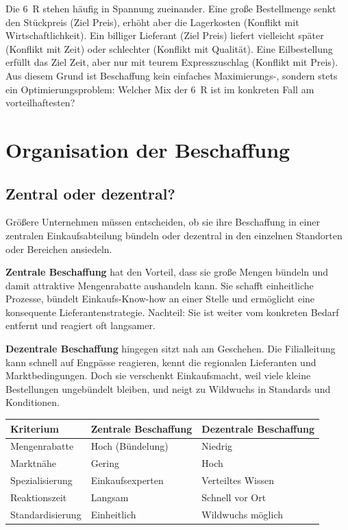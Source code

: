 \documentclass[11pt, a4paper]{article}
\begin{document}
Die 6~R stehen häufig in Spannung zueinander. Eine große Bestellmenge senkt den
Stückpreis (Ziel Preis), erhöht aber die Lagerkosten (Konflikt mit Wirtschaftlichkeit).
Ein billiger Lieferant (Ziel Preis) liefert vielleicht später (Konflikt mit Zeit) oder
schlechter (Konflikt mit Qualität). Eine Eilbestellung erfüllt das Ziel Zeit, aber nur
mit teurem Express­zuschlag (Konflikt mit Preis). Aus diesem Grund ist Beschaffung kein
einfaches Maximierungs-, sondern stets ein Optimierungs­problem: Welcher Mix der 6~R
ist im konkreten Fall am vorteilhaftesten?

\section{Organisation der Beschaffung}

\subsection{Zentral oder dezentral?}

Größere Unternehmen müssen entscheiden, ob sie ihre Beschaffung in einer zentralen
Einkaufsabteilung bündeln oder dezentral in den einzelnen Standorten oder Bereichen
ansiedeln.

\textbf{Zentrale Beschaffung} hat den Vorteil, dass sie große Mengen bündeln und damit
attraktive Mengenrabatte aushandeln kann. Sie schafft einheitliche Prozesse, bündelt
Einkaufs-Know-how an einer Stelle und ermöglicht eine konsequente Lieferantenstrategie.
Nachteil: Sie ist weiter vom konkreten Bedarf entfernt und reagiert oft langsamer.

\textbf{Dezentrale Beschaffung} hingegen sitzt nah am Geschehen. Die Filialleitung kann
schnell auf Engpässe reagieren, kennt die regionalen Lieferanten und Marktbedingungen.
Doch sie verschenkt Einkaufsmacht, weil viele kleine Bestellungen ungebündelt bleiben,
und neigt zu Wildwuchs in Standards und Konditionen.

\begin{tabular}{p{4.2cm} p{5.5cm} p{5.0cm}}
\toprule
\textbf{Kriterium} & \textbf{Zentrale Beschaffung} & \textbf{Dezentrale Beschaffung}\\
\midrule
Mengenrabatte & Hoch (Bündelung) & Niedrig\\
Marktnähe & Gering & Hoch\\
Spezialisierung & Einkaufsexperten & Verteiltes Wissen\\
Reaktionszeit & Langsam & Schnell vor Ort\\
Standardisierung & Einheitlich & Wildwuchs möglich\\
\bottomrule
\end{tabular}
\end{document}
